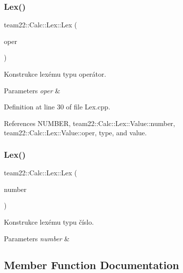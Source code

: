 \subsubsection{\texorpdfstring{Lex()}{Lex()}\hspace{0.1cm}{\footnotesize\ttfamily [1/2]}}
{\footnotesize\ttfamily team22\+::\+Calc\+::\+Lex\+::\+Lex (\begin{DoxyParamCaption}\item[{\hyperlink{classteam22_1_1_calc_1_1_lex_a61d29fc4878a3b36d2de2f13c56ed932}{Operator}}]{oper }\end{DoxyParamCaption})}



Konstrukce lexému typu operátor. 


\begin{DoxyParams}{Parameters}
{\em oper} & \\
\hline
\end{DoxyParams}


Definition at line 30 of file Lex.\+cpp.



References N\+U\+M\+B\+ER, team22\+::\+Calc\+::\+Lex\+::\+Value\+::number, team22\+::\+Calc\+::\+Lex\+::\+Value\+::oper, type, and value.

\mbox{\label{classteam22_1_1_calc_1_1_lex_a95deefe4c4e987fef602fbd621bac095}} 
\subsubsection{\texorpdfstring{Lex()}{Lex()}\hspace{0.1cm}{\footnotesize\ttfamily [2/2]}}
{\footnotesize\ttfamily team22\+::\+Calc\+::\+Lex\+::\+Lex (\begin{DoxyParamCaption}\item[{Math\+::\+Number}]{number }\end{DoxyParamCaption})}



Konstrukce lexému typu číslo. 


\begin{DoxyParams}{Parameters}
{\em number} & \\
\hline
\end{DoxyParams}


\subsection{Member Function Documentation}
\mbox{\label{classteam22_1_1_calc_1_1_lex_a794e75373451a906a2cfc60e5d6b1996}} 
